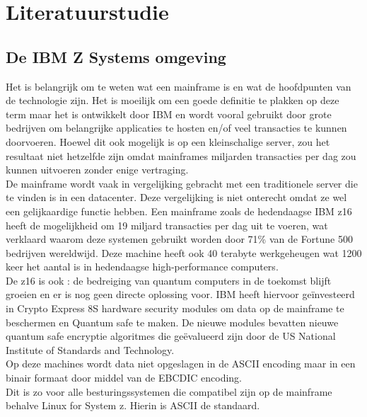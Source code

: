 
\chapter{Literatuurstudie}
\label{ch:literatuurstudie}

\section{De IBM Z Systems omgeving}
\label{sec:De IBM Z Systems omgeving}
Het is belangrijk om te weten wat een mainframe is en wat de hoofdpunten van de technologie zijn. Het is moeilijk om een goede definitie te plakken op deze term maar het is ontwikkelt door IBM en wordt vooral gebruikt door grote bedrijven om belangrijke applicaties te hosten en/of veel transacties te kunnen doorvoeren. Hoewel dit ook mogelijk is op een kleinschalige server, zou het resultaat niet hetzelfde zijn omdat mainframes miljarden transacties per dag zou kunnen uitvoeren zonder enige vertraging. \autocite{BasuMallick2023} \\

De mainframe wordt vaak in vergelijking gebracht met een traditionele server die te vinden is in een datacenter. Deze vergelijking is niet onterecht omdat ze wel een gelijkaardige functie hebben. Een mainframe zoals de hedendaagse IBM z16 heeft de mogelijkheid om 19 miljard transacties per dag uit te voeren, wat verklaard waarom deze systemen gebruikt worden door 71\% van de Fortune 500 bedrijven wereldwijd. Deze machine heeft ook 40 terabyte werkgeheugen wat 1200 keer het aantal is in hedendaagse high-performance computers. \autocite{Tozzi2022} \\

De z16 is ook : de bedreiging van quantum computers in de toekomst blijft groeien en er is nog geen directe oplossing voor. IBM heeft hiervoor geïnvesteerd in Crypto Express 8S hardware security modules om data op de mainframe te beschermen en Quantum safe te maken. De nieuwe modules bevatten nieuwe quantum safe encryptie algoritmes die geëvalueerd zijn door de US National Institute of Standards and Technology. \autocite{Sayer2022} \\

Op deze machines wordt data niet opgeslagen in de ASCII encoding maar in een binair formaat door middel van de EBCDIC encoding. \autocite{Singhal2023} \\ Dit is zo voor alle besturingssystemen die compatibel zijn op de mainframe behalve Linux for System z. Hierin is ASCII de standaard. \autocite{IBMb}


